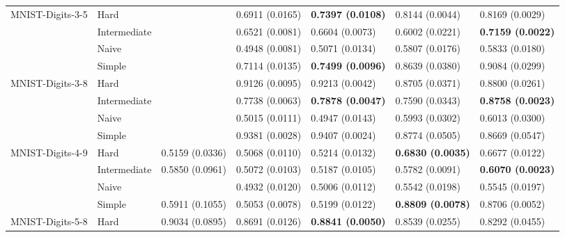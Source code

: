 \begin{tabular}{lllllll}
MNIST-Digits-3-5 & Hard &                  &           0.6911 (0.0165) &  \textbf{0.7397 (0.0108)} &           0.8144 (0.0044) &           0.8169 (0.0029) \\
                 & Intermediate &                  &           0.6521 (0.0081) &           0.6604 (0.0073) &           0.6002 (0.0221) &  \textbf{0.7159 (0.0022)} \\
                 & Naive &                  &           0.4948 (0.0081) &           0.5071 (0.0134) &           0.5807 (0.0176) &           0.5833 (0.0180) \\
                 & Simple &                  &           0.7114 (0.0135) &  \textbf{0.7499 (0.0096)} &           0.8639 (0.0380) &           0.9084 (0.0299) \\
MNIST-Digits-3-8 & Hard &                  &           0.9126 (0.0095) &           0.9213 (0.0042) &           0.8705 (0.0371) &           0.8800 (0.0261) \\
                 & Intermediate &                  &           0.7738 (0.0063) &  \textbf{0.7878 (0.0047)} &           0.7590 (0.0343) &  \textbf{0.8758 (0.0023)} \\
                 & Naive &                  &           0.5015 (0.0111) &           0.4947 (0.0143) &           0.5993 (0.0302) &           0.6013 (0.0300) \\
                 & Simple &                  &           0.9381 (0.0028) &           0.9407 (0.0024) &           0.8774 (0.0505) &           0.8669 (0.0547) \\
MNIST-Digits-4-9 & Hard &  0.5159 (0.0336) &           0.5068 (0.0110) &           0.5214 (0.0132) &  \textbf{0.6830 (0.0035)} &           0.6677 (0.0122) \\
                 & Intermediate &  0.5850 (0.0961) &           0.5072 (0.0103) &           0.5187 (0.0105) &           0.5782 (0.0091) &  \textbf{0.6070 (0.0023)} \\
                 & Naive &                  &           0.4932 (0.0120) &           0.5006 (0.0112) &           0.5542 (0.0198) &           0.5545 (0.0197) \\
                 & Simple &  0.5911 (0.1055) &           0.5053 (0.0078) &           0.5199 (0.0122) &  \textbf{0.8809 (0.0078)} &           0.8706 (0.0052) \\
MNIST-Digits-5-8 & Hard &  0.9034 (0.0895) &           0.8691 (0.0126) &  \textbf{0.8841 (0.0050)} &           0.8539 (0.0255) &           0.8292 (0.0455) \\

\end{tabular}
